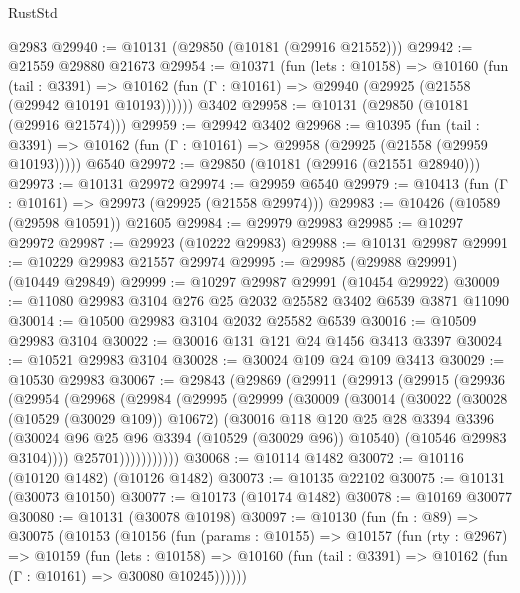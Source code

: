 \begin{lexlean}{RustStd}
\begin{coremodule}
    @2983
@29940 := @10131 (@29850 (@10181 (@29916 @21552)))
@29942 := @21559 @29880 @21673
@29954 := @10371
    (fun (lets : @10158) =>
    @10160
      (fun (tail : @3391) =>
      @10162 (fun (Γ : @10161) => @29940 (@29925 (@21558 (@29942 @10191 @10193))))))
    @3402
@29958 := @10131 (@29850 (@10181 (@29916 @21574)))
@29959 := @29942 @3402
@29968 := @10395
    (fun (tail : @3391) => @10162 (fun (Γ : @10161) => @29958 (@29925 (@21558 (@29959 @10193)))))
    @6540
@29972 := @29850 (@10181 (@29916 (@21551 @28940)))
@29973 := @10131 @29972
@29974 := @29959 @6540
@29979 := @10413 (fun (Γ : @10161) => @29973 (@29925 (@21558 @29974)))
@29983 := @10426 (@10589 (@29598 @10591)) @21605
@29984 := @29979 @29983
@29985 := @10297 @29972
@29987 := @29923 (@10222 @29983)
@29988 := @10131 @29987
@29991 := @10229 @29983 @21557 @29974
@29995 := @29985 (@29988 @29991) (@10449 @29849)
@29999 := @10297 @29987 @29991 (@10454 @29922)
@30009 := @11080 @29983 @3104 @276 @25 @2032 @25582 @3402 @6539 @3871 @11090
@30014 := @10500 @29983 @3104 @2032 @25582 @6539
@30016 := @10509 @29983 @3104
@30022 := @30016 @131 @121 @24 @1456 @3413 @3397
@30024 := @10521 @29983 @3104
@30028 := @30024 @109 @24 @109 @3413
@30029 := @10530 @29983
@30067 := @29843
    (@29869
      (@29911
        (@29913
          (@29915
            (@29936
              (@29954
                (@29968
                  (@29984
                    (@29995
                      (@29999
                        (@30009
                          (@30014
                            (@30022
                              (@30028 (@10529 (@30029 @109)) @10672)
                              (@30016
                                @118
                                @120
                                @25
                                @28
                                @3394
                                @3396
                                (@30024 @96 @25 @96 @3394 (@10529 (@30029 @96)) @10540)
                                (@10546 @29983 @3104))))
                          @25701)))))))))))
@30068 := @10114 @1482
@30072 := @10116 (@10120 @1482) (@10126 @1482)
@30073 := @10135 @22102
@30075 := @10131 (@30073 @10150)
@30077 := @10173 (@10174 @1482)
@30078 := @10169 @30077
@30080 := @10131 (@30078 @10198)
@30097 := @10130
    (fun (fn : @89) =>
    @30075
      (@10153
        (@10156
          (fun (params : @10155) =>
          @10157
            (fun (rty : @2967) =>
            @10159
              (fun (lets : @10158) =>
              @10160 (fun (tail : @3391) => @10162 (fun (Γ : @10161) => @30080 @10245))))))

\end{coremodule}
\end{lexlean}
